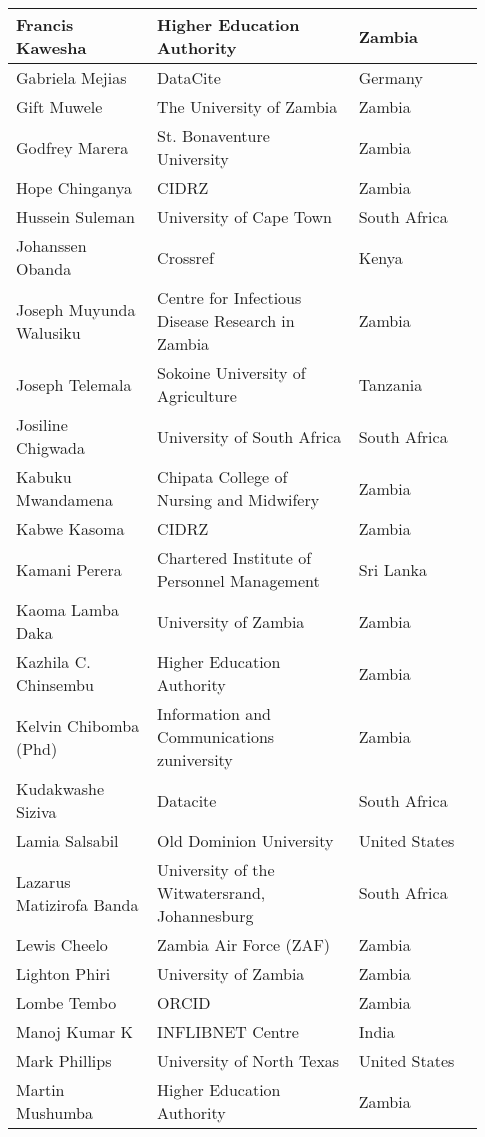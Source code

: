 \begin{center}
\begin{longtable}{p{0.28\linewidth} p{0.4\linewidth} p{0.25\linewidth}}
Francis Kawesha & Higher Education Authority & Zambia \\  \hline
Gabriela Mejias & DataCite & Germany \\  \hline
Gift Muwele & The University of Zambia & Zambia \\  \hline
Godfrey Marera & St. Bonaventure University & Zambia \\  \hline
Hope Chinganya & CIDRZ & Zambia \\  \hline
Hussein Suleman & University of Cape Town & South Africa \\  \hline
Johanssen Obanda & Crossref & Kenya \\  \hline
Joseph Muyunda Walusiku & Centre for Infectious Disease Research in Zambia & Zambia \\  \hline
Joseph Telemala & Sokoine University of Agriculture & Tanzania \\  \hline
Josiline Chigwada & University of South Africa & South Africa \\  \hline
Kabuku Mwandamena & Chipata College of Nursing and Midwifery & Zambia \\  \hline
Kabwe Kasoma & CIDRZ & Zambia \\  \hline
Kamani Perera & Chartered Institute of Personnel Management & Sri Lanka \\  \hline
Kaoma Lamba Daka & University of Zambia & Zambia \\  \hline
Kazhila C. Chinsembu & Higher Education Authority & Zambia \\  \hline
Kelvin Chibomba (Phd) & Information and Communications zuniversity & Zambia \\  \hline
Kudakwashe Siziva & Datacite & South Africa \\  \hline
Lamia Salsabil & Old Dominion University & United States \\  \hline
Lazarus Matizirofa Banda & University of the Witwatersrand, Johannesburg & South Africa \\  \hline
Lewis Cheelo & Zambia Air Force (ZAF) & Zambia \\  \hline
Lighton Phiri & University of Zambia & Zambia \\  \hline
Lombe Tembo & ORCID & Zambia \\  \hline
Manoj Kumar K & INFLIBNET Centre & India \\  \hline
Mark Phillips & University of North Texas & United States \\  \hline
Martin Mushumba & Higher Education Authority & Zambia \\  \hline

\end{longtable}
\end{center}
